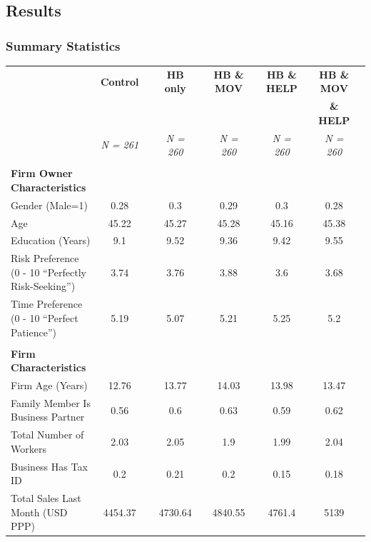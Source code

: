 \documentclass[hideothersubsections, usenames,dvipsnames,10pt]{beamer}
\begin{document}
\subsection{Results}

\begin{frame}
\frametitle{Summary Statistics}
{\tiny{
	\begin{table}
		\centering	

			\begin{tabular}{l*{10}{c}}
			\hline\hline
			\hline


&\multicolumn{1}{c}{\textbf{Control}}
&&\multicolumn{1}{c}{\textbf{HB only}}	
&&\multicolumn{1}{c}{\textbf{HB \& MOV}	}
&&\multicolumn{1}{c}{\textbf{HB \& HELP}}	
&&\multicolumn{1}{c}{\textbf{HB \& MOV}}	\\


&\multicolumn{1}{c}{}
&&\multicolumn{1}{c}{}	
&&\multicolumn{1}{c}{}
&&\multicolumn{1}{c}{}	
&&\multicolumn{1}{c}{\textbf{\& HELP}}	\\


&\textit{N = 261}	
&&\textit{N = 260}	
&&\textit{N = 260}	
&&\textit{N = 260}	
&&\textit{N = 260}	\\
\hline \\

\textbf{Firm Owner Characteristics} \\
Gender (Male=1)											& 0.28	&& 0.3	&&0.29	&& 0.3	&& 0.28\\
Age														&45.22	&&45.27	&&45.28	&&45.16	&&45.38 \\
Education (Years)										&9.1	&&9.52	&&9.36	&&9.42	&&9.55 \\
Risk Preference (0 - 10 ``Perfectly Risk-Seeking'')		&3.74	&&3.76	&&3.88	&&3.6	&&3.68 \\											
Time Preference	(0 - 10 ``Perfect Patience'')			&5.19	&&5.07	&&5.21	&&5.25	&&5.2 \\[0.5ex]
\\														
\textbf{Firm Characteristics} \\
Firm Age (Years)										&12.76		&&13.77		&&14.03		&&13.98		&&13.47 \\
Family Member Is Business Partner							&0.56		&&0.6		&&0.63		&&0.59		&&0.62 \\
Total Number of Workers									&2.03		&&2.05		&&1.9		&&1.99		&&2.04 \\
Business Has Tax ID										&0.2		&&0.21		&&0.2		&&0.15		&&0.18 \\
Total Sales Last Month (USD PPP)						&4454.37 &&	4730.64	&& 4840.55	&& 4761.4	&& 5139 \\
												

\end{tabular}
\end{table}}}
\end{frame}
\end{document}
